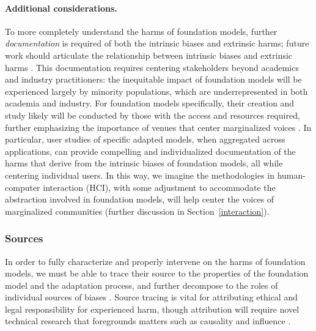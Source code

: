 \paragraph{Additional considerations.} To more completely understand the harms of foundation models, further \textit{documentation} is required of both the intrinsic biases and extrinsic harms; future work should articulate the relationship between intrinsic biases and extrinsic harms \citep{blodgett_language_2020, blodgett2021, goldfarb-tarrant2021}. This documentation requires centering stakeholders beyond academics and industry practitioners: the inequitable impact of foundation models will be experienced largely by minority populations, which are underrepresented in both academia and industry. For foundation models specifically, their creation and study likely will be conducted by those with the access and resources required, further emphasizing the importance of venues that center marginalized voices \citep[][Section~\ref{ethics}]{datafeminism}.
In particular, user studies of specific adapted models, when aggregated across applications, can provide compelling and individualized documentation of the harms that derive from the intrinsic biases of foundation models, all while centering individual users. In this way, we imagine the methodologies in human-computer interaction (HCI), with some adjustment to accommodate the abstraction involved in foundation models, will help center the voices of marginalized communities (further discussion in Section~\ref{interaction}). 

\subsubsection{Sources}
\label{sec:fairness-sources}
In order to fully characterize and properly intervene on the harms of foundation models, we must be able to trace their source to the properties of the foundation model and the adaptation process, and further decompose to the roles of individual sources of biases \citep{friedman1996}. Source tracing is vital for attributing ethical and legal responsibility for experienced harm, though attribution will require novel technical research that foregrounds matters such as causality \citep{pearl2000causality} and influence \citep{koh2017understanding}.

